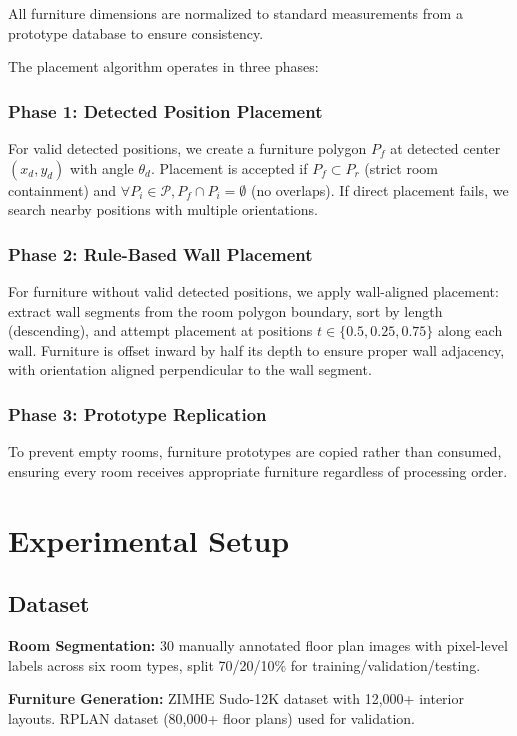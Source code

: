 \documentclass[10pt,conference]{IEEEtran}
\begin{document}
All furniture dimensions are normalized to standard measurements from a prototype database to ensure consistency.

The placement algorithm operates in three phases:

\subsubsection{Phase 1: Detected Position Placement}
For valid detected positions, we create a furniture polygon $P_f$ at detected center $(x_d, y_d)$ with angle $\theta_d$. Placement is accepted if $P_f \subset P_r$ (strict room containment) and $\forall P_i \in \mathcal{P}, P_f \cap P_i = \emptyset$ (no overlaps). If direct placement fails, we search nearby positions with multiple orientations.

\subsubsection{Phase 2: Rule-Based Wall Placement}
For furniture without valid detected positions, we apply wall-aligned placement: extract wall segments from the room polygon boundary, sort by length (descending), and attempt placement at positions $t \in \{0.5, 0.25, 0.75\}$ along each wall. Furniture is offset inward by half its depth to ensure proper wall adjacency, with orientation aligned perpendicular to the wall segment.

\subsubsection{Phase 3: Prototype Replication}
To prevent empty rooms, furniture prototypes are copied rather than consumed, ensuring every room receives appropriate furniture regardless of processing order.

\section{Experimental Setup}

\subsection{Dataset}

\textbf{Room Segmentation:} 30 manually annotated floor plan images with pixel-level labels across six room types, split 70/20/10\% for training/validation/testing.

\textbf{Furniture Generation:} ZIMHE Sudo-12K dataset \cite{b11} with 12,000+ interior layouts. RPLAN dataset \cite{b6} (80,000+ floor plans) used for validation.
\end{document}
